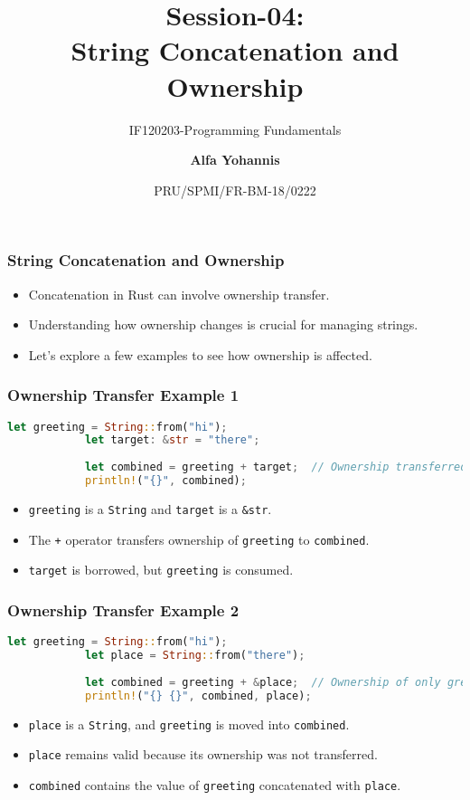 \documentclass[aspectratio=169, table]{beamer}
\subtitle{IF120203-Programming Fundamentals}
\title{Session-04:\\\LARGE{String Concatenation and Ownership}}
\date[Serial]{\scriptsize {PRU/SPMI/FR-BM-18/0222}}
\author[Pradita]{\small{\textbf{Alfa Yohannis}}}
\begin{document}
	
	\frame{\titlepage}
	
	\begin{frame}[fragile]
		\frametitle{String Concatenation and Ownership}
		\begin{itemize}
			\item Concatenation in Rust can involve ownership transfer.
			\item Understanding how ownership changes is crucial for managing strings.
			\item Let's explore a few examples to see how ownership is affected.
		\end{itemize}
	\end{frame}
	
	\begin{frame}[fragile]
		\frametitle{Ownership Transfer Example 1}
		\begin{lstlisting}[language=Rust]
			let greeting = String::from("hi"); 
			let target: &str = "there";
			
			let combined = greeting + target;  // Ownership transferred here
			println!("{}", combined);
		\end{lstlisting}
		\begin{itemize}
			\item \texttt{greeting} is a \texttt{String} and \texttt{target} is a \texttt{\&str}.
			\item The \texttt{+} operator transfers ownership of \texttt{greeting} to \texttt{combined}.
			\item \texttt{target} is borrowed, but \texttt{greeting} is consumed.
		\end{itemize}
	\end{frame}
	
	\begin{frame}[fragile]
		\frametitle{Ownership Transfer Example 2}
		\begin{lstlisting}[language=Rust]
			let greeting = String::from("hi"); 
			let place = String::from("there");
			
			let combined = greeting + &place;  // Ownership of only greeting changed
			println!("{} {}", combined, place); 
		\end{lstlisting}
		\begin{itemize}
			\item \texttt{place} is a \texttt{String}, and \texttt{greeting} is moved into \texttt{combined}.
			\item \texttt{place} remains valid because its ownership was not transferred.
			\item \texttt{combined} contains the value of \texttt{greeting} concatenated with \texttt{place}.
		\end{itemize}
	\end{frame}
	
\end{document}

